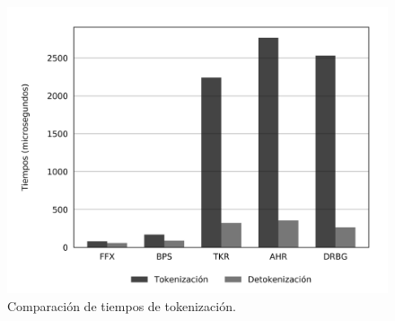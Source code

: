 \begin{figure}
  \begin{center}
    \includegraphics[width=1.0\linewidth]
      {../implementaciones/reportes/tiempos_unitarios.png}
    \caption{Comparación de tiempos de tokenización.}
    \label{figura:tiempos_tokenizacion}
  \end{center}
\end{figure}
